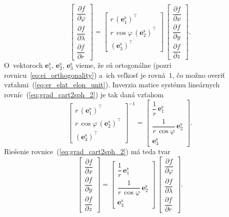 \documentclass[a4paper,12pt]{book}
\let\vec\mathbf
\begin{document}
\begin{equation}
\label{eq:grad_cart2sph_2}
\begin{bmatrix}
\dfrac{\partial f}{\partial \varphi}\\[2ex]
\dfrac{\partial f}{\partial \lambda}\\[2ex]
\dfrac{\partial f}{\partial r}
\end{bmatrix}
%
=
%
\begin{bmatrix}
r \, \left( \vec e^\mathrm{s}_1\right)^\top\\
r \, \cos\varphi \, \left(\vec e^\mathrm{s}_2\right)^\top\\
\left(\vec e^\mathrm{s}_3\right)^\top
\end{bmatrix}
%
\,
%
\begin{bmatrix}
\dfrac{\partial f}{\partial x}\\[2ex]
\dfrac{\partial f}{\partial y}\\[2ex]
\dfrac{\partial f}{\partial z}
\end{bmatrix}
%
{.}
\end{equation}
%
O~vektoroch $\vec e^\mathrm{s}_1$, $\vec e^\mathrm{s}_2$, $\vec e^\mathrm{s}_3$ 
vieme, že sú ortogonálne (pozri rovnicu~\ref{eq:ei_orthogonality}) a~ich 
veľkosť je rovná~$1$, čo možno overiť vzťahmi~(\ref{eq:er_elat_elon_unit}).  
Inverzia matice systému lineárnych rovníc~(\ref{eq:grad_cart2sph_2}) je tak 
daná vzťahom \parencite{MichelLectures}
%
\begin{equation}
\begin{bmatrix}
r \, \left( \vec e^\mathrm{s}_1 \right)^\top\\[2ex]
r \, \cos\varphi \, \left( \vec e^\mathrm{s}_2 \right)^\top\\[2ex]
\left( \vec e^\mathrm{s}_3 \right)^\top
\end{bmatrix}^{-1}
%
=
%
\begin{bmatrix}
\dfrac{1}{r} \, \vec e^\mathrm{s}_1\\[2ex]
\dfrac{1}{r \, \cos\varphi} \, \vec e^\mathrm{s}_2\\[2ex]
\vec e^\mathrm{s}_3
\end{bmatrix}
{.}
\end{equation}
%
Riešenie rovnice~(\ref{eq:grad_cart2sph_2}) má teda tvar
%
\begin{equation}
\label{eq:grad_cart2sph_3}
\begin{bmatrix}
\dfrac{\partial f}{\partial x}\\[2ex]
\dfrac{\partial f}{\partial y}\\[2ex]
\dfrac{\partial f}{\partial z}
\end{bmatrix}
%
=
%
\begin{bmatrix}
\dfrac{1}{r} \, \vec e^\mathrm{s}_1\\[2ex]
\dfrac{1}{r \, \cos\varphi} \, \vec e^\mathrm{s}_2\\[2ex]
\vec e^\mathrm{s}_3
\end{bmatrix}
%
\,
%
\begin{bmatrix}
\dfrac{\partial f}{\partial \varphi}\\[2ex]
\dfrac{\partial f}{\partial \lambda}\\[2ex]
\dfrac{\partial f}{\partial r}
\end{bmatrix}
%
{.}
\end{equation}
\end{document}
